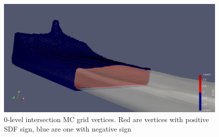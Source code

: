 \begin{figure}[H]
	\begin{center}
		\includegraphics[width=\textwidth]{figures/MlsIntersectionVertexSet.png}
	\end{center}
	\caption{0-level intersection MC grid vertices. Red are vertices with positive SDF sign, blue are one with negative sign}
	\label{fig:intersection_vertices}
\end{figure}


